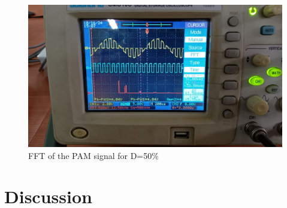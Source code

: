 \documentclass{article}
\begin{document}
\begin{figure}[!ht]
\includegraphics[width=\textwidth]{FFT2.jpeg}
\caption{FFT of the PAM signal for D=50\%}
\label{fig:FFT2}
\end{figure}
\clearpage

\section{Discussion}
\end{document}
